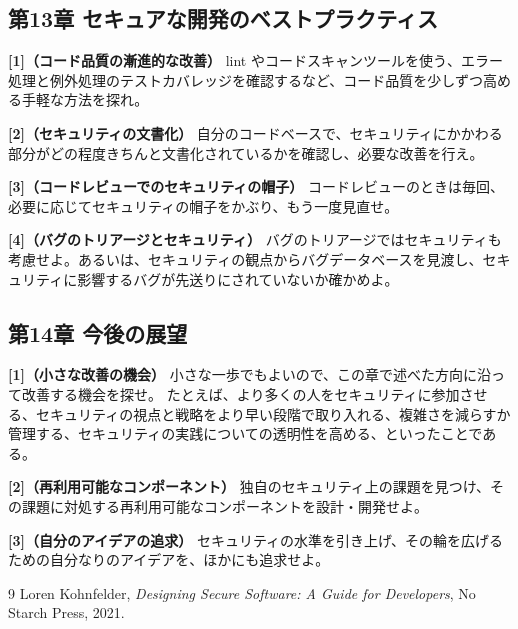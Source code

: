 \documentclass[uplatex]{jsarticle}
\begin{document}
\subsection{第13章 セキュアな開発のベストプラクティス}

\noindent\textbf{[1]（コード品質の漸進的な改善）}\quad
lint やコードスキャンツールを使う、エラー処理と例外処理のテストカバレッジを確認するなど、コード品質を少しずつ高める手軽な方法を探れ。

\noindent\textbf{[2]（セキュリティの文書化）}\quad
自分のコードベースで、セキュリティにかかわる部分がどの程度きちんと文書化されているかを確認し、必要な改善を行え。

\noindent\textbf{[3]（コードレビューでのセキュリティの帽子）}\quad
コードレビューのときは毎回、必要に応じてセキュリティの帽子をかぶり、もう一度見直せ。

\noindent\textbf{[4]（バグのトリアージとセキュリティ）}\quad
バグのトリアージではセキュリティも考慮せよ。あるいは、セキュリティの観点からバグデータベースを見渡し、セキュリティに影響するバグが先送りにされていないか確かめよ。

\subsection{第14章 今後の展望}

\noindent\textbf{[1]（小さな改善の機会）}\quad
小さな一歩でもよいので、この章で述べた方向に沿って改善する機会を探せ。
たとえば、より多くの人をセキュリティに参加させる、セキュリティの視点と戦略をより早い段階で取り入れる、複雑さを減らすか管理する、セキュリティの実践についての透明性を高める、といったことである。

\noindent\textbf{[2]（再利用可能なコンポーネント）}\quad
独自のセキュリティ上の課題を見つけ、その課題に対処する再利用可能なコンポーネントを設計・開発せよ。

\noindent\textbf{[3]（自分のアイデアの追求）}\quad
セキュリティの水準を引き上げ、その輪を広げるための自分なりのアイデアを、ほかにも追求せよ。

\newpage

\begin{thebibliography}{9}
Loren Kohnfelder, \textit{Designing Secure Software: A Guide for Developers}, No Starch Press, 2021.
\end{thebibliography}
\end{document}
